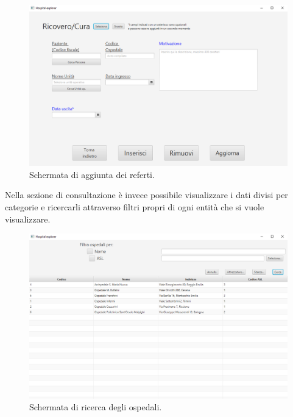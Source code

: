 \documentclass[a4paper,12pt]{report}
\begin{document}
\begin{figure}[H]
	\centering{}
	\includegraphics[width=\textwidth]{img/Screenshot_aggiunta_ricoveri.png}
	\caption{Schermata di aggiunta dei referti.}
	\label{img:add_ricoveri}
\end{figure}

Nella sezione di consultazione è invece possibile visualizzare i dati divisi per categorie e ricercarli attraverso filtri propri di ogni entità che si vuole visualizzare.

\begin{figure}[H]
	\centering{}
	\includegraphics[width=\textwidth]{img/Screenshot_ricerca_ospedale.png}
	\caption{Schermata di ricerca degli ospedali.}
	\label{img:search_hospital}
\end{figure}
\end{document}
